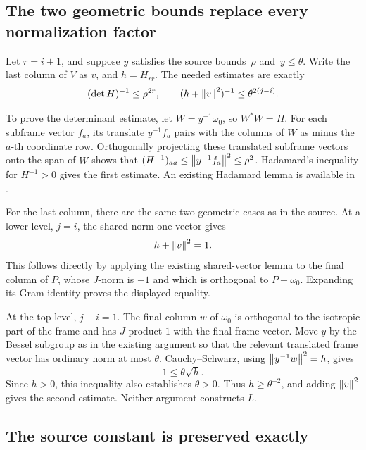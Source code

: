 \subsection{The two geometric bounds replace every normalization factor}

Let \(r=i+1\), and suppose \(y\) satisfies the source bounds
\,\(\rho\) and \,\(y\leq\theta\).
Write the last column of \(V\) as \(v\), and \(h=H_{rr}\).
The needed estimates are exactly
\begin{equation}\label{eq:two-bounds}
 (\det H)^{-1}\leq\rho^{2r},\qquad
 (h+\left\lVert v\right\rVert^2)^{-1}\leq\theta^{2(j-i)}.
\end{equation}

To prove the determinant estimate, let \(W=y^{-1}\omega_0\), so
\(W^*W=H\). For each subframe vector \(f_a\), its translate \(y^{-1}f_a\)
pairs with the columns of \(W\) as minus the \(a\)-th coordinate row.
Orthogonally projecting these translated subframe vectors onto the span of
\(W\) shows that \((H^{-1})_{aa}\leq\left\lVert y^{-1}f_a\right\rVert^2\leq\rho^2\).
Hadamard's inequality for \(H^{-1}>0\) gives the first estimate.
An existing Hadamard lemma is available in
.

For the last column, there are the same two geometric cases as in the source.
At a lower level, \(j=i\), the shared norm-one vector gives
\[
 h+\left\lVert v\right\rVert^2=1.
\]
This follows directly by applying the existing shared-vector lemma to the final
column of \(P\), whose \(J\)-norm is \(-1\) and which is orthogonal to
\(P-\omega_0\). Expanding its Gram identity proves the displayed equality.

At the top level, \(j-i=1\). The final column \(w\) of \(\omega_0\) is orthogonal
to the isotropic part of the frame and has \(J\)-product \(1\) with the final
frame vector. Move \(y\) by the Bessel subgroup as in the existing
 argument so that the relevant translated frame vector has
ordinary norm at most \(\theta\). Cauchy--Schwarz, using
\(\left\lVert y^{-1}w\right\rVert^2=h\), gives
\[
 1\leq\theta\sqrt h.
\]
Since \(h>0\), this inequality also establishes \(\theta>0\).
Thus \(h\geq\theta^{-2}\), and adding \(\left\lVert v\right\rVert^2\) gives the second estimate.
Neither argument constructs \(L\).

\subsection{The source constant is preserved exactly}

